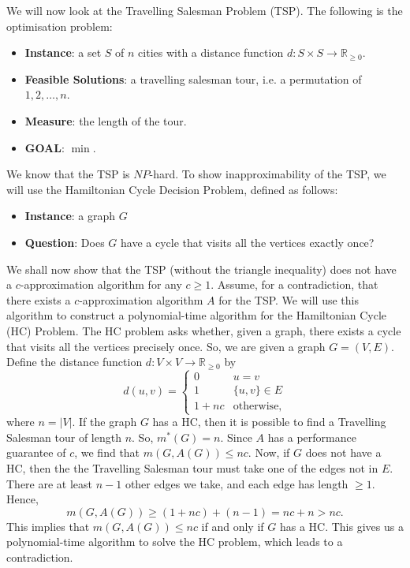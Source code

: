\documentclass[a4paper, openany]{memoir}
\begin{document}
    We will now look at the Travelling Salesman Problem (TSP). The following is the optimisation problem:
    \begin{itemize}
        \item \textbf{Instance}: a set $S$ of $n$ cities with a distance function $d \colon S \times S \to \mathbb{R}_{\geq 0}$.
        \item \textbf{Feasible Solutions}: a travelling salesman tour, i.e. a permutation of $1, 2, \dots, n$.
        \item \textbf{Measure}: the length of the tour.
        \item \textbf{GOAL}: $\min$.
    \end{itemize}
    We know that the TSP is $NP$-hard. To show inapproximability of the TSP, we will use the Hamiltonian Cycle Decision Problem, defined as follows:
    \begin{itemize}
        \item \textbf{Instance}: a graph $G$
        \item \textbf{Question}: Does $G$ have a cycle that visits all the vertices exactly once?
    \end{itemize}

    We shall now show that the TSP (without the triangle inequality) does not have a $c$-approximation algorithm for any $c \geq 1$. Assume, for a contradiction, that there exists a $c$-approximation algorithm $A$ for the TSP. We will use this algorithm to construct a polynomial-time algorithm for the Hamiltonian Cycle (HC) Problem. The HC problem asks whether, given a graph, there exists a cycle that visits all the vertices precisely once. So, we are given a graph $G = (V, E)$. Define the distance function $d \colon V \times V \to \mathbb{R}_{\geq 0}$ by
    \[d(u, v) = \begin{cases}
        0 & u = v \\
        1 & \{u, v\} \in E \\
        1 + nc & \textrm{otherwise},
    \end{cases}\]
    where $n = |V|$. If the graph $G$ has a HC, then it is possible to find a Travelling Salesman tour of length $n$.
    So, $m^*(G) = n$. Since $A$ has a performance guarantee of $c$, we find that $m(G, A(G)) \leq nc$. Now, if $G$ does not have a HC, then the the Travelling Salesman tour must take one of the edges not in $E$. 
    There are at least $n-1$ other edges we take, and each edge has length $\geq 1$. Hence,
    \[m(G, A(G)) \geq (1 + nc) + (n - 1) = nc + n > nc.\]
    This implies that $m(G, A(G)) \leq nc$ if and only if $G$ has a HC. This gives us a polynomial-time algorithm to solve the HC problem, which leads to a contradiction.
\end{document}
